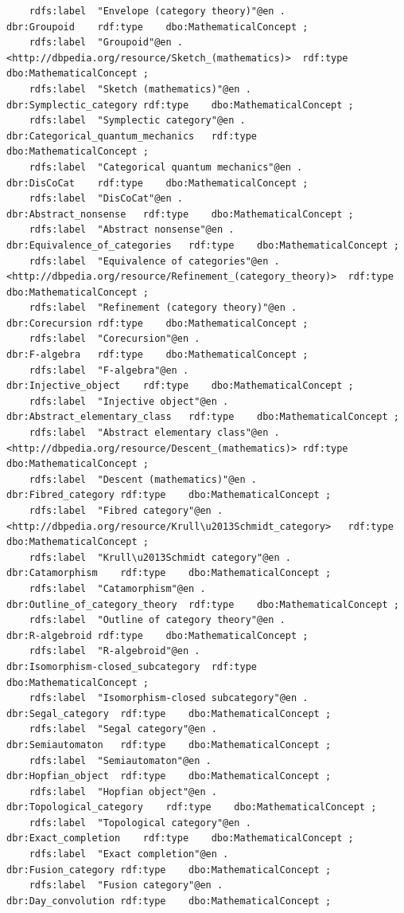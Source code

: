 \begin{verbatim}
	rdfs:label	"Envelope (category theory)"@en .
dbr:Groupoid	rdf:type	dbo:MathematicalConcept ;
	rdfs:label	"Groupoid"@en .
<http://dbpedia.org/resource/Sketch_(mathematics)>	rdf:type	dbo:MathematicalConcept ;
	rdfs:label	"Sketch (mathematics)"@en .
dbr:Symplectic_category	rdf:type	dbo:MathematicalConcept ;
	rdfs:label	"Symplectic category"@en .
dbr:Categorical_quantum_mechanics	rdf:type	dbo:MathematicalConcept ;
	rdfs:label	"Categorical quantum mechanics"@en .
dbr:DisCoCat	rdf:type	dbo:MathematicalConcept ;
	rdfs:label	"DisCoCat"@en .
dbr:Abstract_nonsense	rdf:type	dbo:MathematicalConcept ;
	rdfs:label	"Abstract nonsense"@en .
dbr:Equivalence_of_categories	rdf:type	dbo:MathematicalConcept ;
	rdfs:label	"Equivalence of categories"@en .
<http://dbpedia.org/resource/Refinement_(category_theory)>	rdf:type	dbo:MathematicalConcept ;
	rdfs:label	"Refinement (category theory)"@en .
dbr:Corecursion	rdf:type	dbo:MathematicalConcept ;
	rdfs:label	"Corecursion"@en .
dbr:F-algebra	rdf:type	dbo:MathematicalConcept ;
	rdfs:label	"F-algebra"@en .
dbr:Injective_object	rdf:type	dbo:MathematicalConcept ;
	rdfs:label	"Injective object"@en .
dbr:Abstract_elementary_class	rdf:type	dbo:MathematicalConcept ;
	rdfs:label	"Abstract elementary class"@en .
<http://dbpedia.org/resource/Descent_(mathematics)>	rdf:type	dbo:MathematicalConcept ;
	rdfs:label	"Descent (mathematics)"@en .
dbr:Fibred_category	rdf:type	dbo:MathematicalConcept ;
	rdfs:label	"Fibred category"@en .
<http://dbpedia.org/resource/Krull\u2013Schmidt_category>	rdf:type	dbo:MathematicalConcept ;
	rdfs:label	"Krull\u2013Schmidt category"@en .
dbr:Catamorphism	rdf:type	dbo:MathematicalConcept ;
	rdfs:label	"Catamorphism"@en .
dbr:Outline_of_category_theory	rdf:type	dbo:MathematicalConcept ;
	rdfs:label	"Outline of category theory"@en .
dbr:R-algebroid	rdf:type	dbo:MathematicalConcept ;
	rdfs:label	"R-algebroid"@en .
dbr:Isomorphism-closed_subcategory	rdf:type	dbo:MathematicalConcept ;
	rdfs:label	"Isomorphism-closed subcategory"@en .
dbr:Segal_category	rdf:type	dbo:MathematicalConcept ;
	rdfs:label	"Segal category"@en .
dbr:Semiautomaton	rdf:type	dbo:MathematicalConcept ;
	rdfs:label	"Semiautomaton"@en .
dbr:Hopfian_object	rdf:type	dbo:MathematicalConcept ;
	rdfs:label	"Hopfian object"@en .
dbr:Topological_category	rdf:type	dbo:MathematicalConcept ;
	rdfs:label	"Topological category"@en .
dbr:Exact_completion	rdf:type	dbo:MathematicalConcept ;
	rdfs:label	"Exact completion"@en .
dbr:Fusion_category	rdf:type	dbo:MathematicalConcept ;
	rdfs:label	"Fusion category"@en .
dbr:Day_convolution	rdf:type	dbo:MathematicalConcept ;

\end{verbatim}
